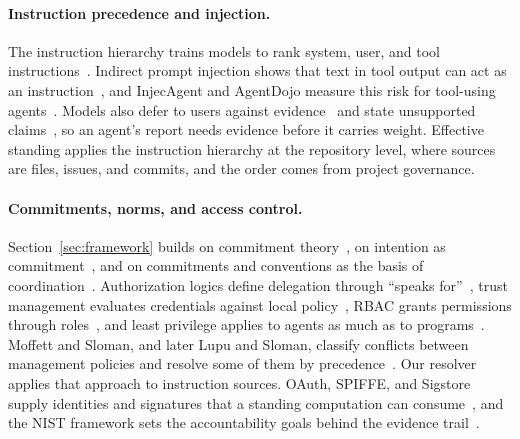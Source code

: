 \paragraph{Instruction precedence and injection.}
The instruction hierarchy trains models to rank system, user, and tool instructions~\cite{wallace2024hierarchy}. Indirect prompt injection shows that text in tool output can act as an instruction~\cite{greshake2023indirect}, and InjecAgent and AgentDojo measure this risk for tool-using agents~\cite{zhan2024injecagent,debenedetti2024agentdojo}. Models also defer to users against evidence~\cite{sharma2024sycophancy} and state unsupported claims~\cite{ji2023hallucination}, so an agent's report needs evidence before it carries weight. Effective standing applies the instruction hierarchy at the repository level, where sources are files, issues, and commits, and the order comes from project governance.

\paragraph{Commitments, norms, and access control.}
Section~\ref{sec:framework} builds on commitment theory~\cite{singh1999commit,singh1998acl,yolum2002flexible}, on intention as commitment~\cite{cohen1990intention}, and on commitments and conventions as the basis of coordination~\cite{jennings1993commitments}. Authorization logics define delegation through ``speaks for''~\cite{lampson1992authentication,abadi1993calculus}, trust management evaluates credentials against local policy~\cite{blaze1996trust}, RBAC grants permissions through roles~\cite{sandhu1996rbac}, and least privilege applies to agents as much as to programs~\cite{saltzer1975protection}. Moffett and Sloman, and later Lupu and Sloman, classify conflicts between management policies and resolve some of them by precedence~\cite{moffett1994policy,lupu1999conflicts}. Our resolver applies that approach to instruction sources. OAuth, SPIFFE, and Sigstore supply identities and signatures that a standing computation can consume~\cite{rfc6749,spiffe2026,newman2022sigstore}, and the NIST framework sets the accountability goals behind the evidence trail~\cite{nist2023airmf}.

